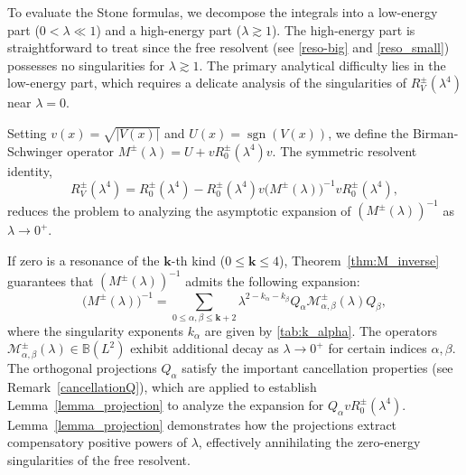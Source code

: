 \documentclass[reqno]{amsart}
\numberwithin{equation}{section}
\begin{document}
To evaluate the Stone formulas, we decompose the integrals into a low-energy part ($0 < \lambda \ll 1$) and a high-energy part ($\lambda \gtrsim 1$). The high-energy part is straightforward to treat since the free resolvent (see \eqref{reso-big} and \eqref{reso_small}) possesses no singularities for $\lambda \gtrsim 1$. The primary analytical difficulty lies in the low-energy part, which requires a delicate analysis of the singularities of $R_V^\pm(\lambda^4)$ near $\lambda=0$.

Setting $v(x) = \sqrt{|V(x)|}$ and $U(x) = \operatorname{sgn}(V(x))$, we define the Birman-Schwinger operator $M^\pm(\lambda) = U + vR_0^\pm(\lambda^4)v$. The symmetric resolvent identity,
\begin{equation}\label{resolvent identity}
	R_V^\pm(\lambda^4) = R_0^\pm(\lambda^4) - R_0^\pm(\lambda^4) v \big(M^\pm(\lambda)\big)^{-1} v R_0^\pm(\lambda^4),
\end{equation}
reduces the problem to analyzing the asymptotic expansion of $(M^{\pm}(\lambda))^{-1}$ as $\lambda \to 0^+$.

If zero is a resonance of the $\mathbf{k}$-th kind ($0\leq\mathbf{k}\leq 4$), Theorem~\ref{thm:M_inverse} guarantees that $(M^\pm(\lambda))^{-1}$ admits the following expansion:
\begin{equation}\label{asymptotic expansion}
	\bigl(M^{\pm}(\lambda)\bigr)^{-1}= \sum_{0\leq\alpha,\beta\leq\mathbf{k}+2}
	\lambda^{2-k_\alpha-k_\beta} Q_\alpha \mathcal{M}_{\alpha,\beta}^{\pm}(\lambda) Q_\beta,
\end{equation}
where the singularity exponents $k_\alpha $ are given by \eqref{tab:k_alpha}. The operators $\mathcal{M}_{\alpha,\beta}^{\pm}(\lambda)\in\mathbb{B}(L^2)$ exhibit additional decay as $\lambda \to 0^+$ for certain indices $\alpha, \beta$. The orthogonal projections $Q_\alpha$ satisfy the important cancellation properties (see Remark~\ref{cancellationQ}), which are applied to  establish Lemma~\ref{lemma_projection} to analyze the expansion for  $Q_\alpha v R_0^\pm(\lambda^4)$. Lemma~\ref{lemma_projection} demonstrates how the projections extract compensatory positive powers of $\lambda$, effectively annihilating the zero-energy singularities of the free resolvent.
\end{document}
